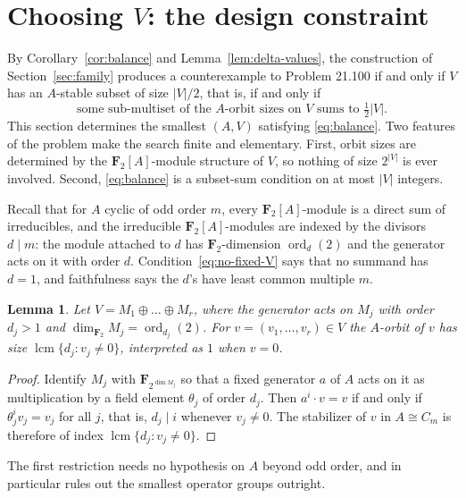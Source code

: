 \documentclass[11pt,a4paper,reqno]{amsart}
\newtheorem{lemma}[theorem]{Lemma}
\theoremstyle{definition}
\theoremstyle{remark}
\newcommand{\F}{\mathbf F}
\begin{document}
\section{Choosing \texorpdfstring{$V$}{V}: the design constraint}
\label{sec:design}

By Corollary~\ref{cor:balance} and Lemma~\ref{lem:delta-values}, the
construction of Section~\ref{sec:family} produces a counterexample to
Problem 21.100 if and only if $V$ has an $A$-stable subset of
size $|V|/2$, that is, if and only if
\begin{equation}\label{eq:balance}
 \text{some sub-multiset of the $A$-orbit sizes on $V$ sums to }
 \tfrac12|V| .
\end{equation}
This section determines the smallest $(A,V)$ satisfying
\eqref{eq:balance}.  Two features of the problem make the search
finite and elementary.  First, orbit sizes are determined by the
$\F_2[A]$-module structure of $V$, so nothing of size $2^{|V|}$ is ever
involved.  Second, \eqref{eq:balance} is a subset-sum condition on at
most $|V|$ integers.

Recall that for $A$ cyclic of odd order $m$, every $\F_2[A]$-module is
a direct sum of irreducibles, and the irreducible $\F_2[A]$-modules are
indexed by the divisors $d\mid m$: the module attached to $d$ has
$\F_2$-dimension $\operatorname{ord}_d(2)$ and the generator acts on it
with order $d$.  Condition~\eqref{eq:no-fixed-V} says that no
summand has $d=1$, and faithfulness says the $d$'s have least common
multiple $m$.

\begin{lemma}\label{lem:orbit-sizes-module}
Let $V=M_1\oplus\dots\oplus M_r$, where the generator acts on $M_j$
with order $d_j>1$ and $\dim_{\F_2}M_j=\operatorname{ord}_{d_j}(2)$.
For $v=(v_1,\dots,v_r)\in V$ the $A$-orbit of $v$ has size
$\operatorname{lcm}\{d_j:v_j\neq0\}$, interpreted as $1$ when $v=0$.
\end{lemma}

\begin{proof}
Identify $M_j$ with $\F_{2^{\dim M_j}}$ so that a fixed generator
$a$ of $A$ acts on it as multiplication by a field element
$\theta_j$ of order $d_j$.  Then $a^i\cdot v=v$ if and only if
$\theta_j^iv_j=v_j$ for all $j$, that is, $d_j\mid i$ whenever
$v_j\neq0$.  The stabilizer of $v$ in $A\cong C_m$ is therefore of
index $\operatorname{lcm}\{d_j:v_j\neq0\}$.
\end{proof}

The first restriction needs no hypothesis on $A$ beyond odd order, and
in particular rules out the smallest operator groups outright.
\end{document}
